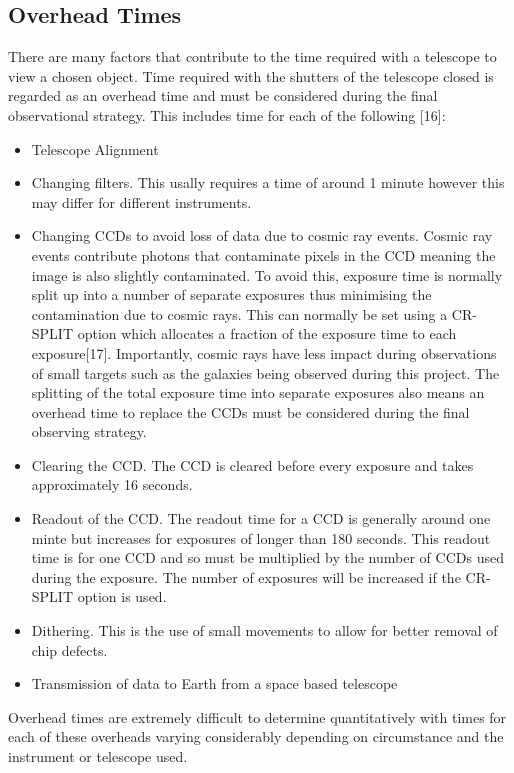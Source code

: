 \documentclass[pdf,color]{UoBnote}
\begin{document}
\subsection{Overhead Times}
There are many factors that contribute to the time required with a telescope to view a chosen object. Time required with the shutters of the telescope closed is regarded as an overhead time and must be considered during the final observational strategy. This includes time for each of the following [16]:
\begin{itemize}
\item Telescope Alignment
\item Changing filters. This usally requires a time of around 1 minute however this may differ for different instruments.
\item Changing CCDs to avoid loss of data due to cosmic ray events. Cosmic ray events contribute photons that contaminate pixels in the CCD meaning the image is also slightly contaminated. To avoid this, exposure time is normally split up into a number of separate exposures thus minimising the contamination due to cosmic rays. This can normally be set using a CR-SPLIT option which allocates a fraction of the exposure time to each exposure[17]. Importantly, cosmic rays have less impact during observations of small targets such as the galaxies being observed during this project. The splitting of the total exposure time into separate exposures also means an overhead time to replace the CCDs must be considered during the final observing strategy.
\item Clearing the CCD. The CCD is cleared before every exposure and takes approximately 16 seconds.
\item Readout of the CCD. The readout time for a CCD is generally around one minte but increases for exposures of longer than 180 seconds. This readout time is for one CCD and so must be multiplied by the number of CCDs used  during the exposure. The number of exposures will be increased if the CR-SPLIT option is used.
\item Dithering. This is the use of small movements to allow for better removal of chip defects.
\item Transmission of data to Earth from a space based telescope
\end{itemize}
\noindent
Overhead times are extremely difficult to determine quantitatively with times for each of these overheads varying considerably depending on circumstance and the instrument or telescope used.\\
\end{document}
